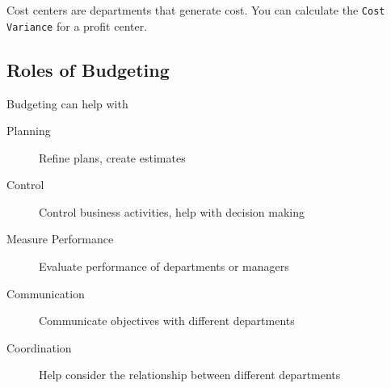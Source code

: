 \documentclass{standalone}
\begin{document}
Cost centers are departments that generate cost.
You can calculate the \texttt{Cost Variance} for a profit center.

\subsection{Roles of Budgeting}
Budgeting can help with 
\begin{description}
    \item[Planning] Refine plans, create estimates
    \item[Control] Control business activities, help with decision making
    \item[Measure Performance] Evaluate performance of departments or managers
    \item[Communication] Communicate objectives with different departments
    \item[Coordination] Help consider the relationship between different departments
\end{description}
\end{document}
